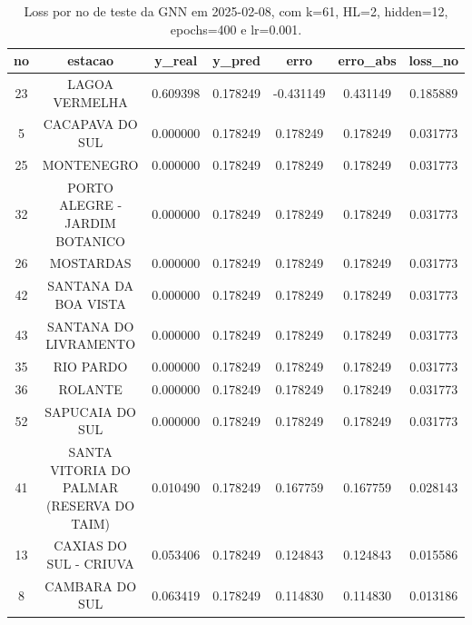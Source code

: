 \begin{table}[h]
\centering
\caption{Loss por no de teste da GNN em 2025-02-08, com k=61, HL=2, hidden=12, epochs=400 e lr=0.001.}
\label{tab:gnn_loss_k61_hl2_h12_e400_d20250208}
\begin{tabular}{ccccccc}
\toprule
no & estacao & y\_real & y\_pred & erro & erro\_abs & loss\_no \\
\midrule
23 & LAGOA VERMELHA & 0.609398 & 0.178249 & -0.431149 & 0.431149 & 0.185889 \\
5 & CACAPAVA DO SUL & 0.000000 & 0.178249 & 0.178249 & 0.178249 & 0.031773 \\
25 & MONTENEGRO & 0.000000 & 0.178249 & 0.178249 & 0.178249 & 0.031773 \\
32 & PORTO ALEGRE - JARDIM BOTANICO & 0.000000 & 0.178249 & 0.178249 & 0.178249 & 0.031773 \\
26 & MOSTARDAS & 0.000000 & 0.178249 & 0.178249 & 0.178249 & 0.031773 \\
42 & SANTANA DA BOA VISTA & 0.000000 & 0.178249 & 0.178249 & 0.178249 & 0.031773 \\
43 & SANTANA DO LIVRAMENTO & 0.000000 & 0.178249 & 0.178249 & 0.178249 & 0.031773 \\
35 & RIO PARDO & 0.000000 & 0.178249 & 0.178249 & 0.178249 & 0.031773 \\
36 & ROLANTE & 0.000000 & 0.178249 & 0.178249 & 0.178249 & 0.031773 \\
52 & SAPUCAIA DO SUL & 0.000000 & 0.178249 & 0.178249 & 0.178249 & 0.031773 \\
41 & SANTA VITORIA DO PALMAR (RESERVA DO TAIM) & 0.010490 & 0.178249 & 0.167759 & 0.167759 & 0.028143 \\
13 & CAXIAS DO SUL - CRIUVA & 0.053406 & 0.178249 & 0.124843 & 0.124843 & 0.015586 \\
8 & CAMBARA DO SUL & 0.063419 & 0.178249 & 0.114830 & 0.114830 & 0.013186 \\
\bottomrule
\end{tabular}
\end{table}
